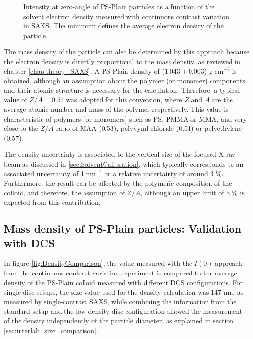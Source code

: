 \begin{figure}
	\begin{center}
		
	\end{center}
	\caption[Zero-angle intensity of the PS-Plain particles.]{Intensity at zero-angle of PS-Plain particles as a function of the solvent electron density measured with continuous contrast variation in SAXS. The minimum defines the average electron density of the particle.}
	\label{fig:PSPlainAverageDensity}
\end{figure}

The mass density of the particle can also be determined by this approach because the electron density is directly proportional to the mass density, as reviewed in chapter \ref{chap:theory_SAXS}. A PS-Plain density of ($1.043\pm0.003$) g cm$^{-3}$ is obtained, although an assumption about the polymer (or monomer) components and their atomic structure is necessary for the calculation. Therefore, a typical value of $Z/A=0.54$ was adopted for this conversion, where $Z$ and $A$ are the average atomic number and mass of the polymer respectively. This value is characteristic of polymers (or monomers) such as PS, PMMA or MMA, and very close to the $Z/A$ ratio of MAA (0.53), polyvynil chloride (0.51) or polyethylene (0.57).

The density uncertainty is associated to the vertical size of the focused X-ray beam as discussed in \ref{sec:SolventCalibration}, which typically corresponds to an associated uncertainty of 1 nm$^{-1}$ or a relative uncertainty of around 3 $\%$. Furthermore, the result can be affected by the polymeric composition of the colloid, and therefore, the assumption of $Z/A$, although an upper limit of 5 $\%$ is expected from this contribution.

\subsection{Mass density of PS-Plain particles: Validation with DCS}

In figure \ref{fig:DensityComparison}, the value measured with the $I(0)$ approach from the continuous contrast variation experiment is compared to the average density of the PS-Plain colloid measured with different DCS configurations. For single disc setups, the size value used for the density calculation was 147 nm, as measured by single-contrast SAXS, while combining the information from the standard setup and the low density disc configuration allowed the measurement of the density independently of the particle diameter, as explained in section \ref{sec:interlab_size_comparison}.

